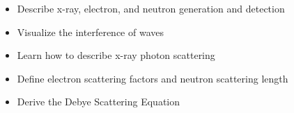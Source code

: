 \begin{learningobjectives}
{\begin{itemize}
    \item[{\color{OCBurntOrange}\ref{\chabbr:sec:particlewaves}:}] Describe x-ray, electron, and neutron generation and detection
    \item[{\color{OCBurntOrange}\ref{\chabbr:sec:interference}:}] Visualize the interference of waves
    \item[{\color{OCBurntOrange}\ref{\chabbr:sec:ThomsonEq}:}] Learn how to describe x-ray photon scattering
    \item[{\color{OCBurntOrange}\ref{\chabbr:sec:elecneutron}:}] Define electron scattering factors and neutron scattering length
    \item[{\color{OCBurntOrange}\ref{\chabbr:sec:scatatoms}:}] Derive the Debye Scattering Equation    
\end{itemize}}
\end{learningobjectives}


% 
% 


